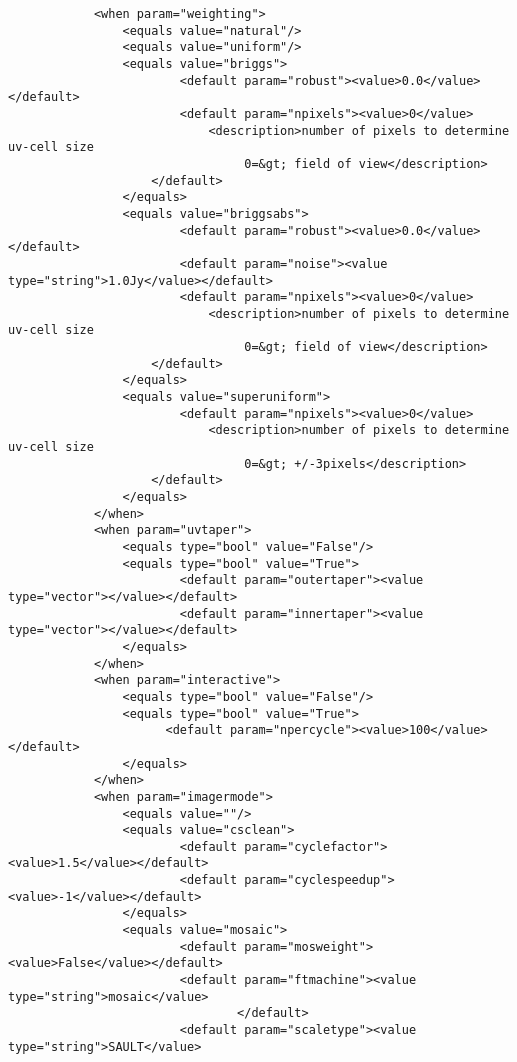 \begin{verbatim}
            <when param="weighting">
                <equals value="natural"/>
                <equals value="uniform"/>
                <equals value="briggs">
                        <default param="robust"><value>0.0</value></default>
                        <default param="npixels"><value>0</value>
                            <description>number of pixels to determine uv-cell size
                                 0=&gt; field of view</description>
                    </default>
                </equals>
                <equals value="briggsabs">
                        <default param="robust"><value>0.0</value></default>
                        <default param="noise"><value type="string">1.0Jy</value></default>
                        <default param="npixels"><value>0</value>
                            <description>number of pixels to determine uv-cell size
                                 0=&gt; field of view</description>
                    </default>
                </equals>
                <equals value="superuniform">
                        <default param="npixels"><value>0</value>
                            <description>number of pixels to determine uv-cell size
                                 0=&gt; +/-3pixels</description>
                    </default>
                </equals>
            </when>
            <when param="uvtaper">
                <equals type="bool" value="False"/>
                <equals type="bool" value="True">
                        <default param="outertaper"><value type="vector"></value></default>
                        <default param="innertaper"><value type="vector"></value></default>
                </equals>
            </when>
            <when param="interactive">
                <equals type="bool" value="False"/>
                <equals type="bool" value="True">
                      <default param="npercycle"><value>100</value></default>
                </equals>
            </when>
            <when param="imagermode">
                <equals value=""/>
                <equals value="csclean">
                        <default param="cyclefactor"><value>1.5</value></default>
                        <default param="cyclespeedup"><value>-1</value></default>
                </equals>
                <equals value="mosaic">
                        <default param="mosweight"><value>False</value></default>
                        <default param="ftmachine"><value type="string">mosaic</value>
                                </default>
                        <default param="scaletype"><value type="string">SAULT</value>

\end{verbatim}

